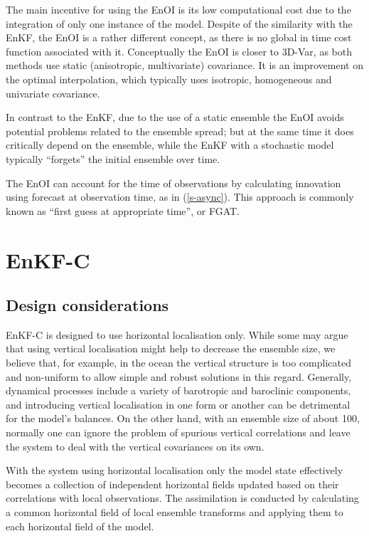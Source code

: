 \documentclass[11pt]{report}
\begin{document}
The main incentive for using the EnOI is its low computational cost due to the integration of only one instance of the model.
Despite of the similarity with the EnKF, the EnOI is a rather different concept, as there is no global in time cost function associated with it.
Conceptually the EnOI is closer to 3D-Var, as both methods use static (anisotropic, multivariate) covariance.
It is an improvement on the optimal interpolation, which typically uses isotropic, homogeneous and univariate covariance.

In contrast to the EnKF, due to the use of a static ensemble the EnOI avoids potential problems related to the ensemble spread; but at the same time it does critically depend on the ensemble, while the EnKF with a stochastic model typically ``forgets'' the initial ensemble over time.

The EnOI can account for the time of observations by calculating innovation using forecast at observation time, as in (\ref{s-async}).
This approach is commonly known as ``first guess at appropriate time'', or FGAT.

\chapter{EnKF-C}
\label{ch:enkf-c}

\section{Design considerations}

EnKF-C is designed to use horizontal localisation only.
While some may argue that using vertical localisation might help to decrease the ensemble size, we believe that, for example, in the ocean the vertical structure is too complicated and non-uniform to allow simple and robust solutions in this regard.
Generally, dynamical processes include a variety of barotropic and baroclinic components, and introducing vertical localisation in one form or another can be detrimental for the model's balances.
On the other hand, with an ensemble size of about 100, normally one can ignore the problem of spurious vertical correlations and leave the system to deal with the vertical covariances on its own.

With the system using horizontal localisation only the model state effectively becomes a collection of independent horizontal fields updated based on their correlations with local observations.
The assimilation is conducted by calculating a common horizontal field of local ensemble transforms and applying them to each horizontal field of the model.
\end{document}
